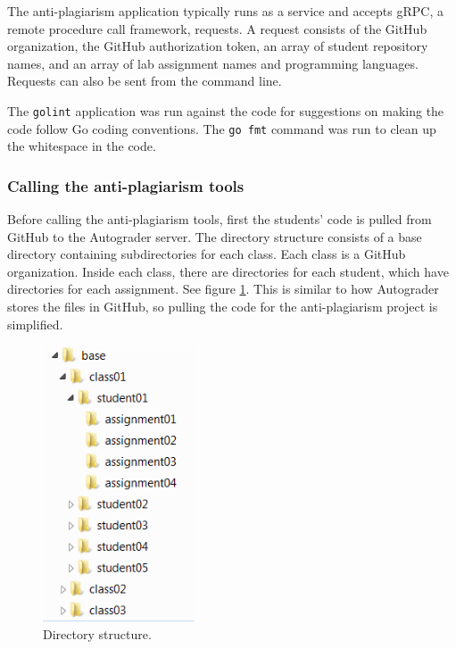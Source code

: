 \documentclass[journal,comsoc]{IEEEtran}
\begin{document}
		The anti-plagiarism application typically runs as a service and accepts gRPC, a remote procedure call framework, requests. A request consists of the GitHub organization, the GitHub authorization token, an array of student repository names, and an array of lab assignment names and programming languages. Requests can also be sent from the command line.
		
		The \verb|golint| application was run against the code for suggestions on making the code follow Go coding conventions. The \verb|go fmt| command was run to clean up the whitespace in the code.
	
			\subsubsection{Calling the anti-plagiarism tools}
			Before calling the anti-plagiarism tools, first the students' code is pulled from GitHub to the Autograder server. The directory structure consists of a base directory containing subdirectories for each class. Each class is a GitHub organization. Inside each class, there are directories for each student, which have directories for each assignment. See figure \ref{fig:directories}. This is similar to how Autograder stores the files in GitHub, so pulling the code for the anti-plagiarism project is simplified.
	
			\begin{figure}[h!]
				\includegraphics[width=0.4\textwidth]{Directories.png}
				\caption{Directory structure.}
				\label{fig:directories}
			\end{figure}
			
\end{document}
